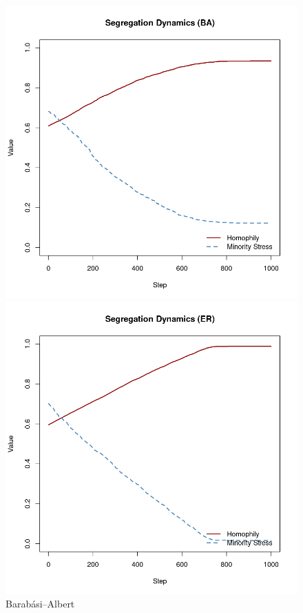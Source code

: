 \begin{figure}[htbp]
    \centering
    \begin{minipage}[t]{0.24\linewidth}
        \centering
        \includegraphics[width=\linewidth]{images/henryba.png}
        \caption{Barabási–Albert}
        \label{fig:henryba}
    \end{minipage}
    \hfill
    \begin{minipage}[t]{0.24\linewidth}
        \centering
        \includegraphics[width=\linewidth]{images/henryer.png}

\end{minipage}
\end{figure}
